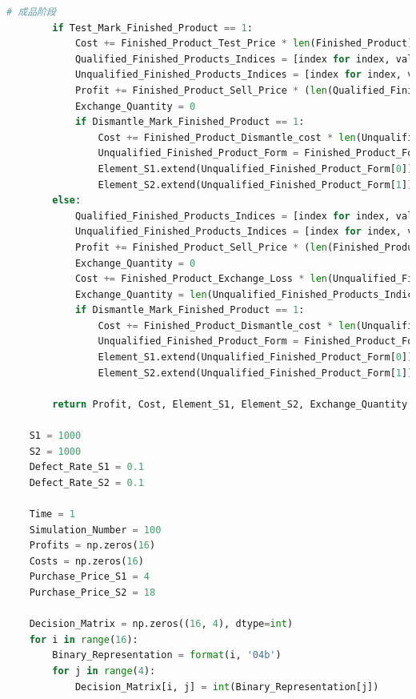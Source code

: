 \documentclass[withoutpreface,bwprint]{cumcmthesis} %
\begin{document}
\begin{appendices}
\begin{lstlisting}[language=python]
		# 成品阶段
		if Test_Mark_Finished_Product == 1:
			Cost += Finished_Product_Test_Price * len(Finished_Product)
			Qualified_Finished_Products_Indices = [index for index, value in enumerate(Finished_Product) if value == 1]
			Unqualified_Finished_Products_Indices = [index for index, value in enumerate(Finished_Product) if value == 0]
			Profit += Finished_Product_Sell_Price * (len(Qualified_Finished_Products_Indices) - Exchange_Quantity)
			Exchange_Quantity = 0
			if Dismantle_Mark_Finished_Product == 1:
				Cost += Finished_Product_Dismantle_cost * len(Unqualified_Finished_Products_Indices)
				Unqualified_Finished_Product_Form = Finished_Product_Form[:, Unqualified_Finished_Products_Indices]
				Element_S1.extend(Unqualified_Finished_Product_Form[0])
				Element_S2.extend(Unqualified_Finished_Product_Form[1])
		else:
			Qualified_Finished_Products_Indices = [index for index, value in enumerate(Finished_Product) if value == 1]
			Unqualified_Finished_Products_Indices = [index for index, value in enumerate(Finished_Product) if value == 0]
			Profit += Finished_Product_Sell_Price * (len(Finished_Product) - Exchange_Quantity)
			Exchange_Quantity = 0
			Cost += Finished_Product_Exchange_Loss * len(Unqualified_Finished_Products_Indices)
			Exchange_Quantity = len(Unqualified_Finished_Products_Indices)
			if Dismantle_Mark_Finished_Product == 1:
				Cost += Finished_Product_Dismantle_cost * len(Unqualified_Finished_Products_Indices)
				Unqualified_Finished_Product_Form = Finished_Product_Form[:, Unqualified_Finished_Products_Indices]
				Element_S1.extend(Unqualified_Finished_Product_Form[0])
				Element_S2.extend(Unqualified_Finished_Product_Form[1])
	
		return Profit, Cost, Element_S1, Element_S2, Exchange_Quantity
	
	S1 = 1000
	S2 = 1000
	Defect_Rate_S1 = 0.1
	Defect_Rate_S2 = 0.1
	
	Time = 1
	Simulation_Number = 100
	Profits = np.zeros(16)
	Costs = np.zeros(16)
	Purchase_Price_S1 = 4
	Purchase_Price_S2 = 18
	
	Decision_Matrix = np.zeros((16, 4), dtype=int)
	for i in range(16):
		Binary_Representation = format(i, '04b')
		for j in range(4):
			Decision_Matrix[i, j] = int(Binary_Representation[j])
	

\end{lstlisting}
\end{appendices}
\end{document}
